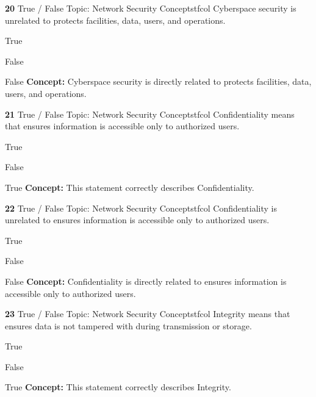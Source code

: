 \documentclass[10pt,a4paper]{article}
\begin{document}
\begin{qcard}{\color{white}\textbf{20} \hfill \small True / False \textbar{} Topic: Network Security Concepts}{tfcol}
Cyberspace security is unrelated to protects facilities, data, users, and operations.

\begin{qoptions}
\item True
\item False
\end{qoptions}
\begin{explainbox}{False}
\textbf{Concept:} Cyberspace security is directly related to protects facilities, data, users, and operations.
\end{explainbox}
\end{qcard}

\begin{qcard}{\color{white}\textbf{21} \hfill \small True / False \textbar{} Topic: Network Security Concepts}{tfcol}
Confidentiality means that ensures information is accessible only to authorized users.

\begin{qoptions}
\item True
\item False
\end{qoptions}
\begin{explainbox}{True}
\textbf{Concept:} This statement correctly describes Confidentiality.
\end{explainbox}
\end{qcard}

\begin{qcard}{\color{white}\textbf{22} \hfill \small True / False \textbar{} Topic: Network Security Concepts}{tfcol}
Confidentiality is unrelated to ensures information is accessible only to authorized users.

\begin{qoptions}
\item True
\item False
\end{qoptions}
\begin{explainbox}{False}
\textbf{Concept:} Confidentiality is directly related to ensures information is accessible only to authorized users.
\end{explainbox}
\end{qcard}

\begin{qcard}{\color{white}\textbf{23} \hfill \small True / False \textbar{} Topic: Network Security Concepts}{tfcol}
Integrity means that ensures data is not tampered with during transmission or storage.

\begin{qoptions}
\item True
\item False
\end{qoptions}
\begin{explainbox}{True}
\textbf{Concept:} This statement correctly describes Integrity.
\end{explainbox}
\end{qcard}
\end{document}

